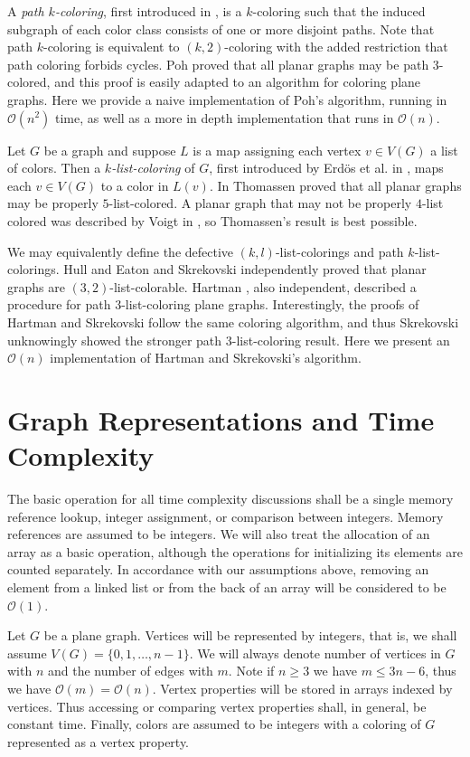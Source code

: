 \documentclass[letterpaper, 12pt]{amsart}
\theoremstyle{definition}
\theoremstyle{definition}
\theoremstyle{thm}
\theoremstyle{definition}
\begin{document}
A \textit{path $k$-coloring}, first introduced in \cite{harary}, is a
$k$-coloring such that the induced subgraph of each color class consists of one
or more disjoint paths. Note that path $k$-coloring is equivalent to
$(k,2)$-coloring with the added restriction that path coloring forbids cycles.
Poh \cite{poh} proved that all planar graphs may be path $3$-colored, and this
proof is easily adapted to an algorithm for coloring plane graphs. Here we
provide a naive implementation of Poh's algorithm, running in $\mathcal{O}(n^2)$
time, as well as a more in depth implementation that runs in $\mathcal{O}(n)$.

Let $G$ be a graph and suppose $L$ is a map assigning each vertex $v\in V(G)$ a
list of colors. Then a \textit{$k$-list-coloring} of $G$, first introduced
by Erd{\"o}s et al. in \cite{erdos}, maps each $v\in V(G)$ to a color in $L(v)$.
In \cite{thomassen} Thomassen proved that all planar graphs may be properly
$5$-list-colored. A planar graph that may not be properly $4$-list colored was
described by Voigt in \cite{voigt}, so Thomassen's result is best possible.

We may equivalently define the defective $(k,l)$-list-colorings and path
$k$-list-colorings. Hull and Eaton \cite{hull} and Skrekovski \cite{skrekovski}
independently proved that planar graphs are $(3,2)$-list-colorable. Hartman
\cite{hartman}, also independent, described a procedure for path
$3$-list-coloring plane graphs. Interestingly, the proofs of Hartman and
Skrekovski follow the same coloring algorithm, and thus Skrekovski
unknowingly showed the stronger path $3$-list-coloring result. Here we present
an $\mathcal{O}(n)$ implementation of Hartman and Skrekovski's algorithm.

\section{Graph Representations and Time Complexity}

The basic operation for all time complexity discussions shall be a single memory
reference lookup, integer assignment, or comparison between integers. Memory
references are assumed to be integers. We will also treat the allocation of an
array as a basic operation, although the operations for initializing its
elements are counted separately. In accordance with our assumptions above,
removing an element from a linked list or from the back of an array will be
considered to be $\mathcal{O}(1)$.

Let $G$ be a plane graph. Vertices will be represented by integers, that is, we
shall assume $V(G)=\{0,1,\ldots,n-1\}$. We will always denote
number of vertices in $G$ with $n$ and the number of edges with $m$. Note if
$n\ge 3$ we have $m\le 3n-6$, thus we have $\mathcal{O}(m)= \mathcal{O}(n)$.
Vertex properties will be stored in arrays indexed by vertices. Thus accessing
or comparing vertex properties shall, in general, be constant time. Finally,
colors are assumed to be integers with a coloring of $G$ represented as
a vertex property.
\end{document}
